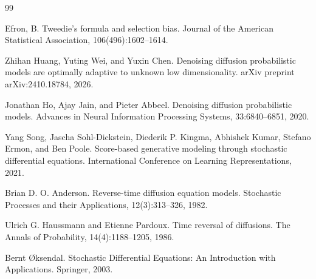 \documentclass[11pt,a4paper]{ltjsarticle}
\theoremstyle{remark}
\begin{document}
\begin{thebibliography}{99}

Efron, B.
\newblock Tweedie’s formula and selection bias.
\newblock Journal of the American Statistical Association,
106(496):1602–1614.

Zhihan Huang, Yuting Wei, and Yuxin Chen.
\newblock Denoising diffusion probabilistic models are optimally adaptive to unknown low dimensionality.
\newblock arXiv preprint arXiv:2410.18784, 2026.

Jonathan Ho, Ajay Jain, and Pieter Abbeel.
\newblock Denoising diffusion probabilistic models.
\newblock Advances in Neural Information Processing Systems, 33:6840--6851, 2020.

Yang Song, Jascha Sohl-Dickstein, Diederik P. Kingma, Abhishek Kumar,
Stefano Ermon, and Ben Poole.
\newblock Score-based generative modeling through stochastic differential equations.
\newblock International Conference on Learning Representations, 2021.

Brian D. O. Anderson.
\newblock Reverse-time diffusion equation models.
\newblock Stochastic Processes and their Applications, 12(3):313--326, 1982.

Ulrich G. Haussmann and Etienne Pardoux.
\newblock Time reversal of diffusions.
\newblock The Annals of Probability, 14(4):1188--1205, 1986.

Bernt {\O}ksendal.
\newblock Stochastic Differential Equations: An Introduction with Applications.
\newblock Springer, 2003.

\end{thebibliography}
\end{document}
